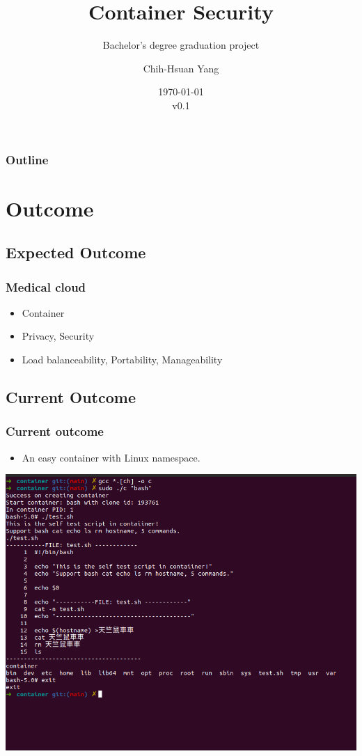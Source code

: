 \documentclass{beamer}
\title{Container Security}
\subtitle{Bachelor's degree graduation project}
\author{Chih-Hsuan Yang}
\institute{National Sun Yat-sen University}
\date{\today\\v0.1}
\begin{document}
\begin{frame}
    \titlepage
\end{frame}

\begin{frame}
    \frametitle{Outline}
    \tableofcontents
\end{frame}

\section{Outcome}
\subsection{Expected Outcome}
\begin{frame}
    \frametitle{Medical cloud}
    \begin{itemize}
        \item Container
        \item Privacy, Security
        \item Load balanceability, Portability, Manageability
    \end{itemize}
\end{frame}

\subsection{Current Outcome}
\begin{frame}
    \frametitle{Current outcome}
    \begin{itemize}
        \item An easy container with Linux namespace.
    \end{itemize}
    \centering\includegraphics[width=1.0\textwidth]{cur_cont.png}
\end{frame}
\end{document}
